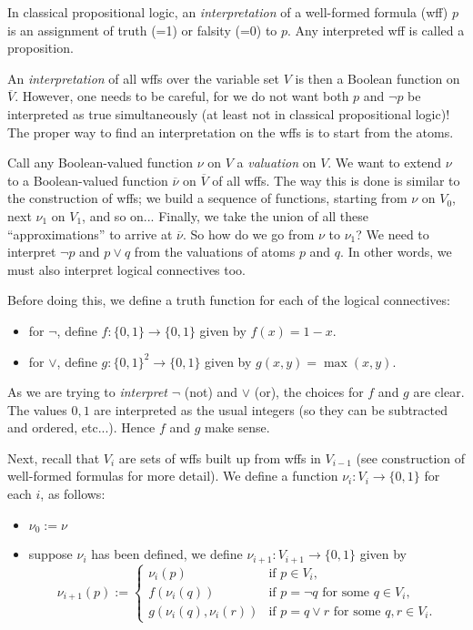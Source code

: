 \documentclass[12pt]{article}
\begin{document}
In classical propositional logic, an \emph{interpretation} of a well-formed formula (wff) $p$ is an assignment of truth (=1) or falsity (=0) to $p$.  Any interpreted wff is called a proposition.  

An \emph{interpretation} of all wffs over the variable set $V$ is then a Boolean function on $\overline{V}$.  However, one needs to be careful, for we do not want both $p$ and $\neg p$ be interpreted as true simultaneously (at least not in classical propositional logic)!  The proper way to find an interpretation on the wffs is to start from the atoms.

Call any Boolean-valued function $\nu$ on $V$ a \emph{valuation} on $V$.  We want to extend $\nu$ to a Boolean-valued function $\overline{\nu}$ on $\overline{V}$ of all wffs.  The way this is done is similar to the construction of wffs; we build a sequence of functions, starting from $\nu$ on $V_0$, next $\nu_1$ on $V_1$, and so on... Finally, we take the union of all these ``approximations'' to arrive at $\overline{\nu}$.  So how do we go from $\nu$ to $\nu_1$?  We need to interpret $\neg p$ and $p\vee q$ from the valuations of atoms $p$ and $q$.  In other words, we must also interpret logical connectives too.

Before doing this, we define a truth function for each of the logical connectives:
\begin{itemize}
\item for $\neg$, define $f:\lbrace 0,1\rbrace \to \lbrace 0,1\rbrace$ given by $f(x)=1-x$.
\item for $\vee$, define $g:\lbrace 0,1\rbrace^2 \to \lbrace 0,1\rbrace$ given by $g(x,y)=\max(x,y)$.
\end{itemize}
As we are trying to \emph{interpret} $\neg$ (not) and $\vee$ (or), the choices for $f$ and $g$ are clear.  The values $0,1$ are interpreted as the usual integers (so they can be subtracted and ordered, etc...).  Hence $f$ and $g$ make sense.

Next, recall that $V_i$ are sets of wffs built up from wffs in $V_{i-1}$ (see construction of well-formed formulas for more detail).  We define a function $\nu_i: V_i\to \lbrace 0,1\rbrace$ for each $i$, as follows: 
\begin{itemize}
\item $\nu_0:=\nu$
\item suppose $\nu_i$ has been defined, we define $\nu_{i+1}:V_{i+1} \to \lbrace 0,1\rbrace$ given by 
\begin{displaymath}
\nu_{i+1}(p):= \left\{
\begin{array}{ll}
\nu_i(p) & \mbox{if } p\in V_i,\\
f(\nu_i(q)) & \mbox{if } p = \neg q\mbox{ for some }q\in V_i, \\
g(\nu_i(q),\nu_i(r)) & \mbox{if } p = q\vee r \mbox{ for some }q,r\in V_i.
\end{array}
\right.
\end{displaymath}
\end{itemize}
\end{document}
